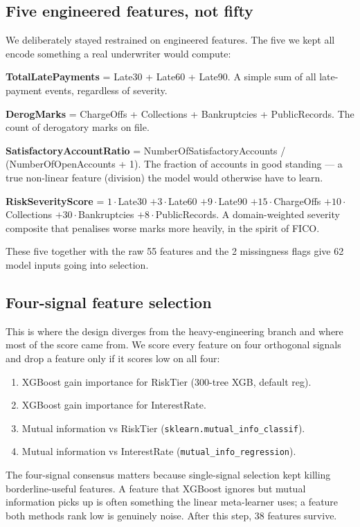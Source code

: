 \documentclass[11pt,a4paper]{article}
\begin{document}
\subsection*{Five engineered features, not fifty}

We deliberately stayed restrained on engineered features. The five we kept all encode something a real underwriter would compute:

\textbf{TotalLatePayments} = Late30 + Late60 + Late90. A simple sum of all late-payment events, regardless of severity.

\textbf{DerogMarks} = ChargeOffs + Collections + Bankruptcies + PublicRecords. The count of derogatory marks on file.

\textbf{SatisfactoryAccountRatio} = NumberOfSatisfactoryAccounts / (NumberOfOpenAccounts + 1). The fraction of accounts in good standing — a true non-linear feature (division) the model would otherwise have to learn.

\textbf{RiskSeverityScore} = $1\!\cdot\!$Late30 $+ 3\!\cdot\!$Late60 $+ 9\!\cdot\!$Late90 $+ 15\!\cdot\!$ChargeOffs $+ 10\!\cdot\!$Collections $+ 30\!\cdot\!$Bankruptcies $+ 8\!\cdot\!$PublicRecords. A domain-weighted severity composite that penalises worse marks more heavily, in the spirit of FICO.

These five together with the raw 55 features and the 2 missingness flags give 62 model inputs going into selection.

\subsection*{Four-signal feature selection}

This is where the design diverges from the heavy-engineering branch and where most of the score came from. We score every feature on four orthogonal signals and drop a feature only if it scores low on all four:

\begin{enumerate}
\item XGBoost gain importance for RiskTier (300-tree XGB, default reg).
\item XGBoost gain importance for InterestRate.
\item Mutual information vs RiskTier (\texttt{sklearn.mutual\_info\_classif}).
\item Mutual information vs InterestRate (\texttt{mutual\_info\_regression}).
\end{enumerate}

The four-signal consensus matters because single-signal selection kept killing borderline-useful features. A feature that XGBoost ignores but mutual information picks up is often something the linear meta-learner uses; a feature both methods rank low is genuinely noise. After this step, 38 features survive.
\end{document}
